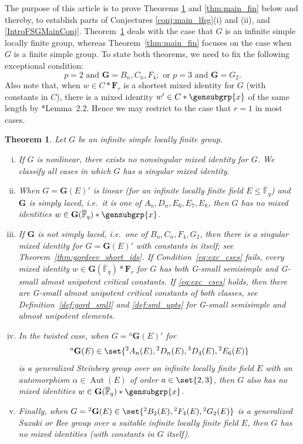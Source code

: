 \documentclass[a4paper,12pt]{amsproc}
\DeclareMathOperator{\Aut}{Aut}
\theoremstyle{plain}
\newtheorem{theorem}[definition]{Theorem}
\theoremstyle{definition}
\begin{document}
\medskip
	
The purpose of this article is to prove Theorems \ref{thm:main_slfg} 
and \ref{thm:main_fin} below and thereby, 
to establish parts of Conjectures \ref{conj:main_lfsg}(i) and (ii),
and \ref{IntroFSGMainConj}. 
Theorem~\ref{thm:main_slfg} deals with the case that $G$ is an infinite simple locally finite group, whereas Theorem~\ref{thm:main_fin} focuses on the case when $G$ is a finite simple group. To state both theorems, we need to fix the following exceptional condition:
\begin{equation}\label{eq:exc_cses}
p=2\text{ and } \mathbf{G}=B_n,C_n,F_4;\text{ or }p=3\text{ and }\mathbf{G}=G_2.\tag{$\star$}
\end{equation}
Also note that, when $w\in C\ast\mathbf{F}_r$ is a shortest mixed identity for $G$ (with constants in $C$), there is a mixed identity $w'\in C\ast\gensubgrp{x}$ of the same length by \cite{bradfordschneiderthom2023length}*{Lemma~2.2}. Hence we may restrict to the case that $r=1$ in most cases.
    
\begin{theorem}\label{thm:main_slfg}
Let $G$ be an infinite simple locally finite group.
\begin{enumerate}[(i)]
\item If $G$ is nonlinear, there exists no nonsingular mixed identity for $G$. We classify all cases in which $G$ has a singular mixed identity.
\item When $G=\mathbf{G}(E)'$ is linear (for an infinite locally finite field $E\leq\overline{\mathbb{F}}_q$) and $\mathbf{G}$ is \emph{simply laced}, i.e.\ it is one of $A_n,D_n,E_6,E_7,E_8$, then $G$ has no mixed identities $w\in\mathbf{G}(\overline{\mathbb{F}}_q)\ast\gensubgrp{x}$. 
\item If $\mathbf{G}$ is not simply laced, i.e.\ one of $B_n,C_n,F_4, G_2$, then there is a singular mixed identity for $G=\mathbf{G}(E)'$ with constants in itself; see Theorem~\ref{thm:gordeev_short_ids}. If Condition~\eqref{eq:exc_cses} fails, every mixed identity $w\in\mathbf{G}(\overline{\mathbb{F}}_q)\ast\mathbf{F}_r$ for $G$ has both G-small semisimple and G-small almost unipotent critical constants. If \eqref{eq:exc_cses} holds, then there are G-small almost unipotent critical constants of both classes, see  Definition~\ref{def:gord_smll} and \ref{def:sml_upts} for G-small semisimple and almost unipotent elements.
\item In the twisted case, when $G={}^a\mathbf{G}(E)'$ for
$$
{}^a\mathbf{G}(E)\in\set{{}^2A_n(E),{}^2D_n(E),{}^3D_4(E),{}^2E_6(E)}
$$ 
is a generalized Steinberg group over an infinite locally finite field $E$ with an automorphism $\alpha\in\Aut(E)$ of order $a\in\set{2,3}$, then $G$ also has no mixed identities $w\in\mathbf{G}(\overline{\mathbb{F}}_q)\ast\gensubgrp{x}$.
\item Finally, when $G={}^2\mathbf{G}(E)\in\set{{}^2B_2(E),{}^2F_4(E),{}^2G_2(E)}$ is a generalized Suzuki or Ree group over a suitable infinite locally finite field $E$, then $G$ has no mixed identities (with constants in $G$ itself).
\end{enumerate}     
\end{theorem}
\end{document}
